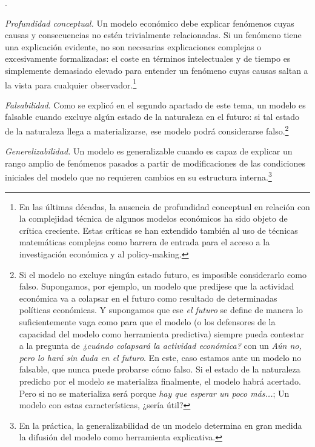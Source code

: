 \documentclass[10pt,a4paper]{article}
\newcounter{numitem}
\newenvironment{lnum}
      {\begin{list}{\arabic{numitem}.}{%
          \usecounter{numitem}%
          \setlength{\leftmargin}{1cm}%
          \setlength{\parskip}{3pt}%
          \setlength{\itemsep}{0pt}%
          \setlength{\parsep}{0pt}%
      }}
      {\end{list}}
\begin{document}
\begin{lnum}
    \item \textit{Profundidad conceptual.} Un modelo económico debe explicar fenómenos cuyas causas y consecuencias no estén trivialmente relacionadas. Si un fenómeno tiene una explicación evidente, no son necesarias explicaciones complejas o excesivamente formalizadas: el coste en términos intelectuales y de tiempo es simplemente demasiado elevado para entender un fenómeno cuyas causas saltan a la vista para cualquier observador.\footnote{%
        En las últimas décadas, la ausencia de profundidad conceptual en relación con la complejidad técnica de algunos modelos económicos ha sido objeto de crítica creciente. Estas críticas se han extendido también al uso de técnicas matemáticas complejas como barrera de entrada para el acceso a la investigación económica y al policy-making.
    }
    \item \textit{Falsabilidad}. Como se explicó en el segundo apartado de este tema, un modelo es falsable cuando excluye algún estado de la naturaleza en el futuro: si tal estado de la naturaleza llega a materializarse, ese modelo podrá considerarse falso.\footnote{%
        Si el modelo no excluye ningún estado futuro, es imposible considerarlo como falso. Supongamos, por ejemplo, un modelo que predijese que la actividad económica va a colapsar en el futuro como resultado de determinadas políticas económicas. Y supongamos que ese \textit{el futuro} se define de manera lo suficientemente vaga como para que el modelo (o los defensores de la capacidad del modelo como herramienta predictiva) siempre pueda contestar a la pregunta de \textit{¿cuándo colapsará la actividad económica?} con un \textit{Aún no, pero lo hará sin duda en el futuro}. En este, caso estamos ante un modelo no falsable, que nunca puede probarse cómo falso. Si el estado de la naturaleza predicho por el modelo se materializa finalmente, el modelo habrá acertado. Pero si no se materializa será porque \textit{hay que esperar un poco más...}; Un modelo con estas características, ¿sería útil?
    }
    \item \textit{Generelizabilidad.} Un modelo es generalizable cuando es capaz de explicar un rango amplio de fenómenos pasados a partir de modificaciones de las condiciones iniciales del modelo que no requieren cambios en su estructura interna.\footnote{%
        En la práctica, la generalizabilidad de un modelo determina en gran medida la difusión del modelo como herramienta explicativa. 
    
}
\end{lnum}
\end{document}

